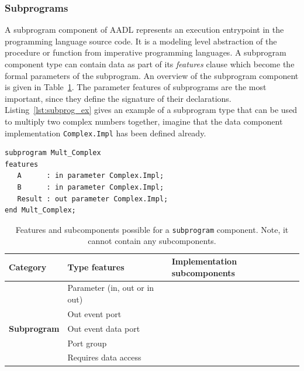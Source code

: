 \subsubsection{Subprograms} A subprogram component of AADL represents an
execution entrypoint in the programming language source code. It is a
modeling level abstraction of the procedure or function from
imperative programming languages. A subprogram component type can
contain data as part of its \emph{features} clause which become the
formal parameters of the subprogram. An overview of the subprogram
component is given in Table~\ref{tab:subprog_rules}. The parameter
features of subprograms are the most important, since they define the
signature of their declarations. Listing~\ref{lst:subprog_ex} gives an
example of a subprogram type that can be used to multiply two complex
numbers together, imagine that the data component implementation
\texttt{Complex.Impl} has been defined already.

\begin{center}
\begin{minipage}{0.75\linewidth}
\lstset{language=aadl}
\begin{lstlisting}[label=lst:subprog_ex, caption=A subprogram type
    definition to multiply two complex numbers]
subprogram Mult_Complex
features
   A      : in parameter Complex.Impl;
   B      : in parameter Complex.Impl;
   Result : out parameter Complex.Impl;
end Mult_Complex;
\end{lstlisting}
\end{minipage}
\end{center}

\begin{table}
\centering
\begin{tabular}{|l|l|l|}
\hline
\textbf{Category} & \textbf{Type features} & \textbf{Implementation
  subcomponents} \\
\hline
 & Parameter (in, out or in out) & \\
 & Out event port & \\
\textbf{Subprogram} & Out event data port & \\
 & Port group & \\
 & Requires data access & \\
\hline
\end{tabular}
\label{tab:subprog_rules}
\caption{Features and subcomponents possible for a \texttt{subprogram}
  component. Note, it cannot contain any subcomponents.}
\end{table}

